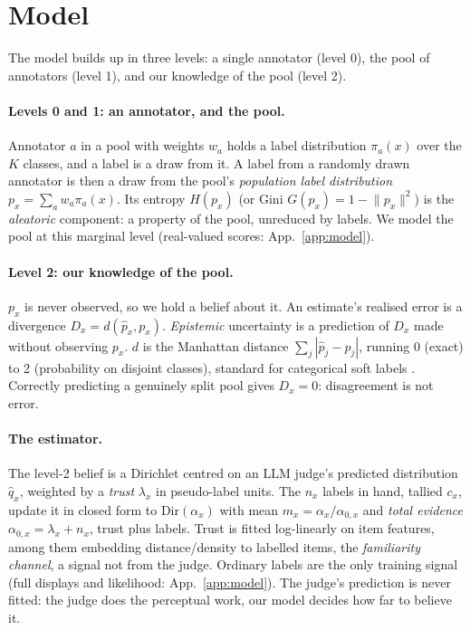 \documentclass{article}
\begin{document}
\section{Model}
\label{sec:model}

The model builds up in three levels: a single annotator (level 0), the pool of
annotators (level 1), and our knowledge of the pool (level 2).

\paragraph{Levels 0 and 1: an annotator, and the pool.}
Annotator $a$ in a pool with weights $w_a$ holds a label distribution
$\pi_a(x)$ over the $K$ classes, and a label is a draw from it. A label from a
randomly drawn annotator is then a draw from the pool's \emph{population label
distribution} $p_x = \sum_a w_a \pi_a(x)$. Its entropy $H(p_x)$ (or Gini
$G(p_x) = 1 - \lVert p_x \rVert^2$) is the \emph{aleatoric} component: a
property of the pool, unreduced by labels. We model the pool at this
marginal level (real-valued scores: App.~\ref{app:model}).

\paragraph{Level 2: our knowledge of the pool.}
$p_x$ is never observed, so we hold a belief about it. An estimate's realised error is a
divergence $D_x = d(\hat p_x, p_x)$. \emph{Epistemic} uncertainty is a
prediction of $D_x$ made without observing $p_x$. $d$ is the Manhattan distance
$\sum_j |\hat p_j - p_j|$, running 0 (exact) to 2 (probability on disjoint
classes), standard for categorical soft labels \citep{leonardelli2025}.
Correctly predicting a genuinely split pool gives $D_x = 0$: disagreement is not
error.

\paragraph{The estimator.}
The level-2 belief is a Dirichlet centred on an LLM judge's predicted distribution
$\hat q_x$, weighted by a \emph{trust} $\lambda_x$ in pseudo-label units. The
$n_x$ labels in hand, tallied $c_x$, update it in closed form to
$\mathrm{Dir}(\alpha_x)$ with mean
$m_x = \alpha_x / \alpha_{0,x}$ and \emph{total evidence}
$\alpha_{0,x} = \lambda_x + n_x$, trust plus labels. Trust is fitted log-linearly
on item features, among them embedding distance/density to labelled items, the
\emph{familiarity channel}, a signal not from the judge. Ordinary labels are the
only training signal (full displays and likelihood: App.~\ref{app:model}). The
judge's prediction is never fitted: the judge does the perceptual work, our model
decides how far to believe it.
\end{document}
